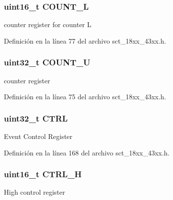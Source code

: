 \subsubsection[{\texorpdfstring{C\+O\+U\+N\+T\+\_\+L}{COUNT_L}}]{ uint16\+\_\+t C\+O\+U\+N\+T\+\_\+L}\hypertarget{struct_l_p_c___s_c_t___t_ac8f117cf2b90b29a2f9265752bbac1aa}{}\label{struct_l_p_c___s_c_t___t_ac8f117cf2b90b29a2f9265752bbac1aa}
counter register for counter L 

Definición en la línea 77 del archivo sct\+\_\+18xx\+\_\+43xx.\+h.

\subsubsection[{\texorpdfstring{C\+O\+U\+N\+T\+\_\+U}{COUNT_U}}]{ uint32\+\_\+t C\+O\+U\+N\+T\+\_\+U}\hypertarget{struct_l_p_c___s_c_t___t_a131b12557075fc56049d15045f430c66}{}\label{struct_l_p_c___s_c_t___t_a131b12557075fc56049d15045f430c66}
counter register 

Definición en la línea 75 del archivo sct\+\_\+18xx\+\_\+43xx.\+h.

\subsubsection[{\texorpdfstring{C\+T\+RL}{CTRL}}]{\setlength{\rightskip}{0pt plus 5cm}uint32\+\_\+t C\+T\+RL}\hypertarget{struct_l_p_c___s_c_t___t_a3be6514ca3bd369fd0de9f8f49471179}{}\label{struct_l_p_c___s_c_t___t_a3be6514ca3bd369fd0de9f8f49471179}
Event Control Register 

Definición en la línea 168 del archivo sct\+\_\+18xx\+\_\+43xx.\+h.

\subsubsection[{\texorpdfstring{C\+T\+R\+L\+\_\+H}{CTRL_H}}]{ uint16\+\_\+t C\+T\+R\+L\+\_\+H}\hypertarget{struct_l_p_c___s_c_t___t_a3daf21dc3405c95c831aa6e76854dfee}{}\label{struct_l_p_c___s_c_t___t_a3daf21dc3405c95c831aa6e76854dfee}
High control register 

